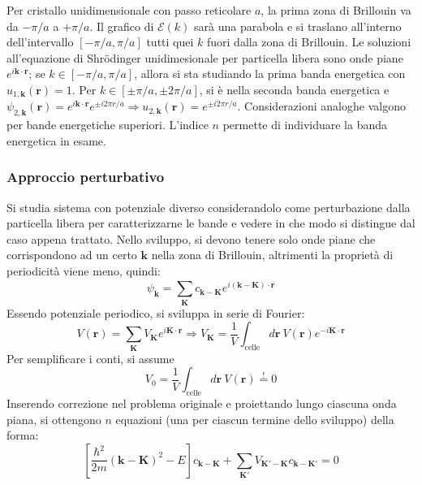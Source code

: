 \documentclass[10pt, a4paper]{scrartcl}
\numberwithin{equation}{subsection}
\theoremstyle{style1}
\begin{document}
Per cristallo unidimensionale con passo reticolare $a$, la prima zona di Brillouin va da $- \pi / a$ a $ + \pi / a$. Il grafico di $\mathscr{E}(k)$ sar\`a una parabola e si traslano all'interno dell'intervallo $[-\pi/a,\pi / a]$ tutti quei $k$ fuori dalla zona di Brillouin. Le soluzioni all'equazione di Shr\"odinger unidimesionale per particella libera sono onde piane $e^{i \mathbf{k} \cdot \mathbf{r} } $; se $k\in [-\pi / a, \pi /a]$, allora si sta studiando la prima banda energetica con $u_{1,\mathbf{k} } (\mathbf{r} ) = 1$. Per $k\in [\pm\pi / a, \pm2 \pi /a]$, si \`e nella seconda banda energetica e $\psi _{2,\mathbf{k} }(\mathbf{r} ) = e^{i \mathbf{k} \cdot \mathbf{r} }  e^{\pm i 2\pi r / a }  \Rightarrow u_{2,\mathbf{k}}(\mathbf{r} ) =e^{\pm i 2\pi r / a}  $. Considerazioni analoghe valgono per bande energetiche superiori. L'indice $n$ permette di individuare la banda energetica in esame.

\subsubsection{Approccio perturbativo}


Si studia sistema con potenziale diverso considerandolo come perturbazione dalla particella libera per caratterizzarne le bande e vedere in che modo si distingue dal caso appena trattato. Nello sviluppo, si devono tenere solo onde piane che corrispondono ad un certo $\mathbf{k} $ nella zona di Brillouin, altrimenti la propriet\`a di periodicit\`a viene meno, quindi:
\begin{equation}
	\psi _{\mathbf{k} } = \sum_{\mathbf{K} }^{} c_{\mathbf{k} - \mathbf{K} } e^{i(\mathbf{k} -\mathbf{K} ) \cdot  \mathbf{r} } 
\end{equation}
Essendo potenziale periodico, si sviluppa in serie di Fourier:
\begin{equation}
	V(\mathbf{r} ) = \sum_{\mathbf{K} }^{} V_\mathbf{K} e^{i \mathbf{K} \cdot \mathbf{ r} } \Rightarrow V_\mathbf{K} = \frac{1}{V}\int_{\text{celle}} d\mathbf{r}  \ V(\mathbf{r} ) e^{-i\mathbf{K} \cdot \mathbf{r} } 
\end{equation}
Per semplificare i conti, si assume
\[
V_0 = \frac{1}{V} \int_{\text{celle}} d\mathbf{r} \ V(\mathbf{r} ) \stackrel{!}{=} 0
\] 
Inserendo correzione nel problema originale e proiettando lungo ciascuna onda piana, si ottengono $n$ equazioni (una per ciascun termine dello sviluppo) della forma:
\begin{equation}
	\left[ \frac{\hbar ^2}{2m} (\mathbf{k}-\mathbf{K} )^2 - E \right] c_{\mathbf{k} -\mathbf{K} } + \sum_{\mathbf{K} '}^{} V_{\mathbf{K} ' - \mathbf{K} } c_{\mathbf{k} -\mathbf{K} '} =0
\end{equation}
\end{document}
